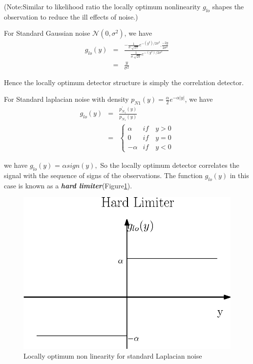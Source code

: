 \documentclass[12pt]{report}
\begin{document}
	 \noindent (Note:Similar to likelihood ratio the locally optimum nonlinearity $g_{lo}$ shapes the observation to reduce the ill effects of noise.)
	
	\begin{exmp}
		 For Standard Gaussian noise $\mathcal{N}(0,\sigma^2)$, we have
		\begin{eqnarray}
		g_{lo}(y)&=& 
		\frac{-\frac{1}{\sigma.\sqrt{2\pi}}e^{-(y^2)/2\sigma^2}.\frac{-2y}{2\sigma^2}}{\frac{1}{\sigma.\sqrt{2\pi}}e^{-(y^2)/2\sigma^2}}\\&=&\frac{y}{\sigma^2}
		\end{eqnarray}
		\par Hence the locally optimum detector structure is simply the correlation detector.
	\end{exmp}
	
	\begin{exmp} For Standard laplacian noise with density $p_{N1}(y) = \frac{\alpha}{2}e^{-\alpha |y|}$, we have
		\begin{eqnarray}
		g_{lo}(y)&=& \frac{p_{N_{1}}^\prime(y)}{p_{N_{1}}(y)}\\
		&=&
		\begin{cases}
		\alpha&if \quad y > 0\\
		 0&if \quad y=0\\
		{-\alpha}&if \quad y < 0
		\end{cases}
		\end{eqnarray}
		
		\par we have $g_{lo}(y)$ = $\alpha sign(y),$ So the locally optimum detector correlates the signal with the sequence of signs of the observations. The function  $g_{lo}(y)$ in this case is known as a \textbf{\textit{hard limiter}}(Figure\ref{fig:Hard Limiter}).
		
		\begin{figure}[h]
			\centering
			\includegraphics[scale=0.6]{Figures/HardLimiter.eps}
			\caption{Locally optimum non linearity for standard Laplacian noise}
			\label{fig:Hard Limiter}
		\end{figure}
	\end{exmp}
	
\end{document}
